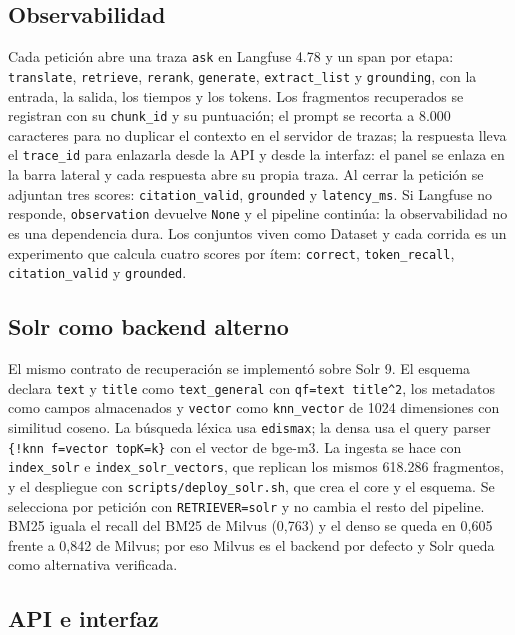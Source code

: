 \subsection{Observabilidad}
\label{sec:obs-metodo}

Cada petici\'on abre una traza \texttt{ask} en Langfuse 4.78 y un span por etapa: \texttt{translate}, \texttt{retrieve}, \texttt{rerank}, \texttt{generate}, \texttt{extract\_list} y \texttt{grounding}, con la entrada, la salida, los tiempos y los tokens. Los fragmentos recuperados se registran con su \texttt{chunk\_id} y su puntuaci\'on; el prompt se recorta a 8.000 caracteres para no duplicar el contexto en el servidor de trazas; la respuesta lleva el \texttt{trace\_id} para enlazarla desde la API y desde la interfaz: el panel se enlaza en la barra lateral y cada respuesta abre su propia traza. Al cerrar la petici\'on se adjuntan tres scores: \texttt{citation\_valid}, \texttt{grounded} y \texttt{latency\_ms}. Si Langfuse no responde, \texttt{observation} devuelve \texttt{None} y el pipeline contin\'ua: la observabilidad no es una dependencia dura. Los conjuntos viven como Dataset y cada corrida es un experimento que calcula cuatro scores por \'item: \texttt{correct}, \texttt{token\_recall}, \texttt{citation\_valid} y \texttt{grounded}.

\subsection{Solr como backend alterno}
\label{sec:solr}

El mismo contrato de recuperaci\'on se implement\'o sobre Solr 9. El esquema declara \texttt{text} y \texttt{title} como \texttt{text\_general} con \texttt{qf=text title\^{}2}, los metadatos como campos almacenados y \texttt{vector} como \texttt{knn\_vector} de 1024 dimensiones con similitud coseno. La b\'usqueda l\'exica usa \texttt{edismax}; la densa usa el query parser \texttt{\{!knn f=vector topK=k\}} con el vector de bge-m3. La ingesta se hace con \texttt{index\_solr} e \texttt{index\_solr\_vectors}, que replican los mismos 618.286 fragmentos, y el despliegue con \texttt{scripts/deploy\_solr.sh}, que crea el core y el esquema. Se selecciona por petici\'on con \texttt{RETRIEVER=solr} y no cambia el resto del pipeline. BM25 iguala el recall del BM25 de Milvus (0,763) y el denso se queda en 0,605 frente a 0,842 de Milvus; por eso Milvus es el backend por defecto y Solr queda como alternativa verificada.

\subsection{API e interfaz}
\label{sec:api}

